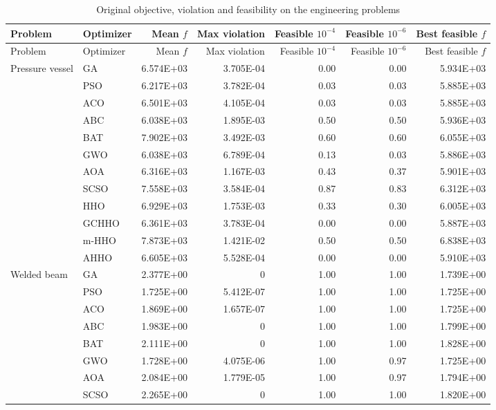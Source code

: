 \begin{longtable}{llrrrrr}
\caption{Original objective, violation and feasibility on the engineering problems}\label{tab:eng-feas}\\
\toprule
Problem & Optimizer & Mean $f$ & Max violation & Feasible $10^{-4}$ & Feasible $10^{-6}$ & Best feasible $f$ \\
\midrule
\endfirsthead
\toprule
Problem & Optimizer & Mean $f$ & Max violation & Feasible $10^{-4}$ & Feasible $10^{-6}$ & Best feasible $f$ \\
\midrule
\endhead
\bottomrule
\endfoot
Pressure vessel & GA & 6.574E+03 & 3.705E-04 & 0.00 & 0.00 & 5.934E+03 \\
 & PSO & 6.217E+03 & 3.782E-04 & 0.03 & 0.03 & 5.885E+03 \\
 & ACO & 6.501E+03 & 4.105E-04 & 0.03 & 0.03 & 5.885E+03 \\
 & ABC & 6.038E+03 & 1.895E-03 & 0.50 & 0.50 & 5.936E+03 \\
 & BAT & 7.902E+03 & 3.492E-03 & 0.60 & 0.60 & 6.055E+03 \\
 & GWO & 6.038E+03 & 6.789E-04 & 0.13 & 0.03 & 5.886E+03 \\
 & AOA & 6.316E+03 & 1.167E-03 & 0.43 & 0.37 & 5.901E+03 \\
 & SCSO & 7.558E+03 & 3.584E-04 & 0.87 & 0.83 & 6.312E+03 \\
 & HHO & 6.929E+03 & 1.753E-03 & 0.33 & 0.30 & 6.005E+03 \\
 & GCHHO & 6.361E+03 & 3.783E-04 & 0.00 & 0.00 & 5.887E+03 \\
 & m-HHO & 7.873E+03 & 1.421E-02 & 0.50 & 0.50 & 6.838E+03 \\
 & AHHO & 6.605E+03 & 5.528E-04 & 0.00 & 0.00 & 5.910E+03 \\
\addlinespace
Welded beam & GA & 2.377E+00 & 0 & 1.00 & 1.00 & 1.739E+00 \\
 & PSO & 1.725E+00 & 5.412E-07 & 1.00 & 1.00 & 1.725E+00 \\
 & ACO & 1.869E+00 & 1.657E-07 & 1.00 & 1.00 & 1.725E+00 \\
 & ABC & 1.983E+00 & 0 & 1.00 & 1.00 & 1.799E+00 \\
 & BAT & 2.111E+00 & 0 & 1.00 & 1.00 & 1.828E+00 \\
 & GWO & 1.728E+00 & 4.075E-06 & 1.00 & 0.97 & 1.725E+00 \\
 & AOA & 2.084E+00 & 1.779E-05 & 1.00 & 0.97 & 1.794E+00 \\
 & SCSO & 2.265E+00 & 0 & 1.00 & 1.00 & 1.820E+00 \\

\end{longtable}
